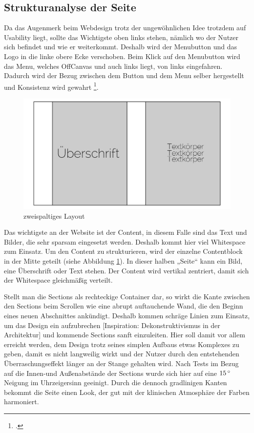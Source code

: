 	\subsection{Strukturanalyse der Seite}

Da das Augenmerk beim Webdesign trotz der ungewöhnlichen Idee trotzdem auf Usability liegt, sollte das Wichtigste oben links stehen, nämlich wo der Nutzer sich befindet und wie er weiterkommt. Deshalb wird der Menubutton und das Logo in die linke obere Ecke verschoben. Beim Klick auf den Menubutton wird das Menu, welches OffCanvas und auch links liegt, von links eingefahren. Dadurch wird der Bezug zwischen dem Button und dem Menu selber hergestellt und Konsistenz wird gewahrt \footcite[vgl.][]{MaterialD:menu}.
 \begin{figure} [htp]
\includegraphics[width=\textwidth]{./img/inno_struct1.png}
\caption{zweispaltiges Layout}
\label{inno_Struct1}
\end{figure}
Das wichtigste an der Website ist der Content, in diesem Falle sind das Text und Bilder, die sehr sparsam eingesetzt werden. Deshalb kommt hier viel Whitespace zum Einsatz. Um den Content zu strukturieren, wird der einzelne Contentblock in der Mitte geteilt (siehe Abbildung \ref{inno_Struct1}). In dieser halben „Seite“ kann ein Bild, eine Überschrift oder Text stehen. Der Content wird vertikal zentriert, damit sich der Whitespace gleichmäßig verteilt.

Stellt man die Sections als rechteckige Container dar, so wirkt die Kante zwischen den Sections beim Scrollen wie eine abrupt auftauchende Wand, die den Beginn eines neuen Abschnittes ankündigt. Deshalb kommen schräge Linien zum Einsatz, um das Design ein aufzubrechen [Inspiration: Dekonstruktivismus in der Architektur] und kommende Sections sanft einzuleiten. Hier soll damit vor allem erreicht werden, dem Design trotz seines simplen Aufbaus etwas Komplexes zu geben, damit es nicht langweilig wirkt und der Nutzer durch den entstehenden Überraschungseffekt länger an der Stange gehalten wird. Nach Tests im Bezug auf die Innen-und Außenabstände der Sections wurde sich hier auf eine $15\,^{\circ}{\rm}$ Neigung im Uhrzeigersinn geeinigt. Durch die dennoch gradlinigen Kanten bekommt die Seite einen Look, der gut mit der klinischen Atmosphäre der Farben harmoniert. 


